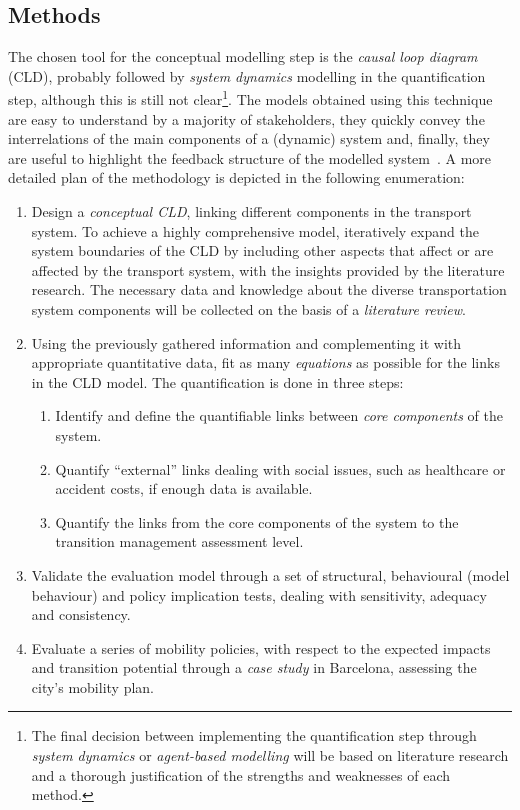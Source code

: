 \begin{multicols}{2}
\subsection*{Methods}
The chosen tool for the conceptual modelling step is the \textit{causal loop diagram} (CLD), probably followed by \textit{system dynamics} modelling in the quantification step, although this is still not clear\footnote{The final decision between implementing the quantification step through \textit{system dynamics} or \textit{agent-based modelling} will be based on literature research and a thorough justification of the strengths and weaknesses of each method.}. The models obtained using this technique are easy to understand by a majority of stakeholders, they quickly convey the interrelations of the main components of a (dynamic) system and, finally, they are useful to highlight the feedback structure of the modelled system~\parencite{ghosh2015_DynamicSystemsEveryone}. A more detailed plan of the methodology is depicted in the following enumeration:
%
\begin{enumerate}[label=(\alph*)]
	\item Design a \textit{conceptual CLD}, linking different components in the transport system. To achieve a highly comprehensive model, iteratively expand the system boundaries of the CLD by including other aspects that affect or are affected by the transport system, with the insights provided by the literature research. The necessary data and knowledge about the diverse transportation system components will be collected on the basis of a \textit{literature review}.
	\item Using the previously gathered information and complementing it with appropriate quantitative data, fit as many \textit{equations} as possible for the links in the CLD model. The quantification is done in three steps:
	\begin{enumerate}[label=\roman*.]
		\item Identify and define the quantifiable links between \textit{core components} of the system.
		\item Quantify ``external'' links dealing with social issues, such as healthcare or accident costs, if enough data is available.
		\item Quantify the links from the core components of the system to the transition management assessment level.
	\end{enumerate}
	\item Validate the evaluation model through a set of structural, behavioural (model behaviour) and policy implication tests, dealing with sensitivity, adequacy and consistency.
	\item Evaluate a series of mobility policies, with respect to the expected impacts and transition potential through a \textit{case study} in Barcelona, assessing the city's mobility plan.
\end{enumerate}


\end{multicols}
